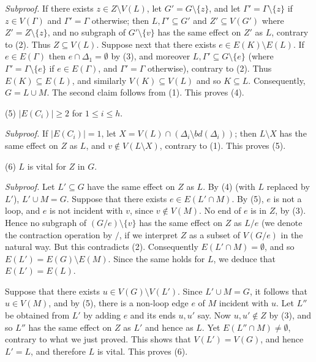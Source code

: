 \textit{Subproof.} If there exists $z \in Z \setminus V(L)$, let $G' = G \setminus \{z\}$, and let $\Gamma' = \Gamma \setminus \{z\}$ if $z \in V(\Gamma)$ and $\Gamma' = \Gamma$ otherwise; then $L, \Gamma' \subseteq G'$ and $Z' \subseteq V(G')$ where $Z' = Z \setminus \{z\}$, and no subgraph of $G' \setminus \{v\}$ has the same effect on $Z'$ as $L$, contrary to (2). Thus $Z \subseteq V(L)$. Suppose next that there exists $e \in E(K) \setminus E(L)$. If $e \in E(\Gamma)$ then $e \cap \Delta_1 = \emptyset$ by (3), and moreover $L, \Gamma' \subseteq G \setminus \{e\}$ (where $\Gamma' = \Gamma \setminus \{e\}$ if $e \in E(\Gamma)$, and $\Gamma' = \Gamma$ otherwise), contrary to (2). Thus $E(K) \subseteq E(L)$, and similarly $V(K) \subseteq V(L)$ and so $K \subseteq L$. Consequently, $G = L \cup M$. The second claim follows from (1). This proves (4).

\hspace*{12pt}(5) $|E(C_i)| \ge 2$ for $1 \le i \le h$.

\textit{Subproof.} If $|E(C_i)| = 1$, let $X = V(L) \cap (\Delta_i \setminus bd(\Delta_i))$; then $L \setminus X$ has the same effect on $Z$ as $L$, and $v \notin V(L \setminus X)$, contrary to (1). This proves (5).

\hspace*{12pt}(6) $L$ is vital for $Z$ in $G$.

\textit{Subproof.} Let $L' \subseteq G$ have the same effect on $Z$ as $L$. By (4) (with $L$ replaced by $L'$), $L' \cup M = G$. Suppose that there exists $e \in E(L' \cap M)$. By (5), $e$ is not a loop, and $e$ is not incident with $v$, since $v \notin V(M)$. No end of $e$ is in $Z$, by (3). Hence no subgraph of $(G/e) \setminus \{v\}$ has the same effect on $Z$ as $L/e$ (we denote the contraction operation by $/$, if we interpret $Z$ as a subset of $V(G/e)$ in the natural way. But this contradicts (2). Consequently $E(L' \cap M) = \emptyset$, and so $E(L') = E(G) \setminus E(M)$. Since the same holds for $L$, we deduce that $E(L') = E(L)$.

Suppose that there exists $u \in V(G) \setminus V(L')$. Since $L' \cup M = G$, it follows that $u \in V(M)$, and by (5), there is a non-loop edge $e$ of $M$ incident with $u$. Let $L''$ be obtained from $L'$ by adding $e$ and its ends $u, u'$ say. Now $u, u' \notin Z$ by (3), and so $L''$ has the same effect on $Z$ as $L'$ and hence as $L$. Yet $E(L'' \cap M) \ne \emptyset$, contrary to what we just proved. This shows that $V(L') = V(G)$, and hence $L' = L$, and therefore $L$ is vital. This proves (6).

